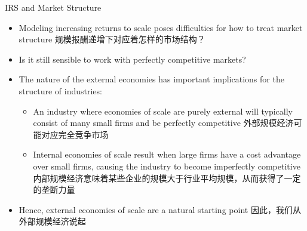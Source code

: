 \documentclass[10pt,hyperref={CJKbookmarks=true},xcolor=dvipsnames,aspectratio=169]{beamer}
\begin{document}
\begin{frame}{IRS and Market Structure}

\begin{itemize}
\item Modeling increasing returns to scale poses difficulties for how to
treat market structure 规模报酬递增下对应着怎样的市场结构？
\item Is it still sensible to work with perfectly competitive markets? 
\item The nature of the external economies has important implications for
the structure of industries: 

\begin{itemize}
\item An industry where economies of scale are purely external will typically
consist of many small firms and be perfectly competitive 外部规模经济可能对应完全竞争市场
\item Internal economies of scale result when large firms have a cost advantage
over small firms, causing the industry to become imperfectly competitive
内部规模经济意味着某些企业的规模大于行业平均规模，从而获得了一定的垄断力量
\end{itemize}
\item Hence, external economies of scale are a natural starting point 因此，我们从外部规模经济说起
\end{itemize}
\end{frame}
\end{document}
